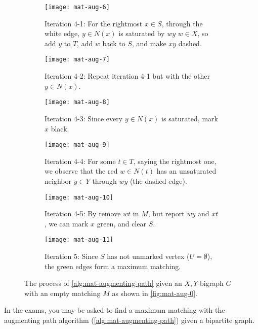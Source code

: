 \documentclass[../src/handouts/main.tex]{subfiles}
\begin{document}
\begin{figure}
  \begin{subfigure}[t]{\width}
    \centering
    \texttt{[image: mat-aug-6]}
    \caption{Iteration 4-1: For the rightmost $x \in S$, through the white edge, $y \in N(x)$ is saturated by $wy$ $w \in X$, so add $y$ to $T$, add $w$ back to $S$, and make $xy$ dashed.}
    \label{fig:mat-aug-4-1}
  \end{subfigure}
  \gap
  \begin{subfigure}[t]{\width}
    \centering
    \texttt{[image: mat-aug-7]}
    \caption{Iteration 4-2: Repeat iteration 4-1 but with the other $y \in N(x)$.}
    \label{fig:mat-aug-4-2}
  \end{subfigure}
  \gap
  \begin{subfigure}[t]{\width}
    \centering
    \texttt{[image: mat-aug-8]}
    \caption{Iteration 4-3: Since every $y \in N(x)$ is saturated, mark $x$ black.}
    \label{fig:mat-aug-4-3}
  \end{subfigure}

  \begin{subfigure}[t]{\width}
    \centering
    \texttt{[image: mat-aug-9]}
    \caption{Iteration 4-4: For some $t \in T$, saying the rightmost one, we observe that the red $w \in N(t)$ has an unsaturated neighbor $y \in Y$ through $wy$ (the dashed edge).}
    \label{fig:mat-aug-4-4}
  \end{subfigure}
  \gap
  \begin{subfigure}[t]{\width}
    \centering
    \texttt{[image: mat-aug-10]}
    \caption{Iteration 4-5: By remove $wt$ in $M$, but report $wy$ and $xt$, we can mark $x$ green, and clear $S$.}
    \label{fig:mat-aug-4-5}
  \end{subfigure}
  \gap
  \begin{subfigure}[t]{\width}
    \centering
    \texttt{[image: mat-aug-11]}
    \caption{Iteration 5: Since $S$ has not unmarked vertex ($U = \emptyset$), the green edges form a maximum matching.}
    \label{fig:mat-aug-5}
  \end{subfigure}

  \caption{The process of \cref{alg:mat-augmenting-path} given an $X, Y$-bigraph $G$ with an empty matching $M$ as shown in \cref{fig:mat-aug-0}.}
  \label{fig:mat-aug}
\end{figure}

In the exams, you may be asked to find a maximum matching with the augmenting path algorithm (\cref{alg:mat-augmenting-path}) given a bipartite graph.
\end{document}

